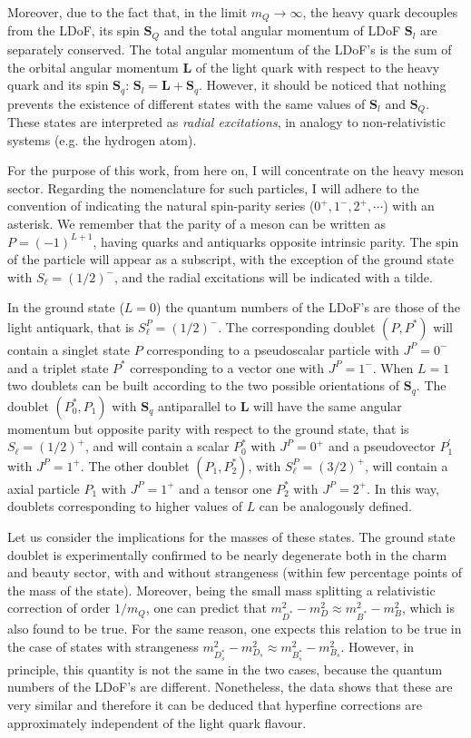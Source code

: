 Moreover, due to the fact that, in the limit $m_Q \to \infty$, the heavy quark decouples from the LDoF, its spin $\symbf{S}_Q$ and the total angular momentum of LDoF $\symbf{S}_l$ are separately conserved. The total angular momentum of the LDoF's is the sum of the orbital angular momentum $\symbf{L}$ of the light quark with respect to the heavy quark and its spin $\symbf{S}_q$: $\symbf{S}_l = \symbf{L} + \symbf{S}_q$. However, it should be noticed that nothing prevents the existence of different states with the same values of $\symbf{S}_l$ and $\symbf{S}_Q$. These states are interpreted as \emph{radial excitations}, in analogy to non-relativistic systems (e.g. the hydrogen atom).

For the purpose of this work, from here on, I will concentrate on the heavy meson sector. Regarding the nomenclature for such particles, I will adhere to the convention of indicating the natural spin-parity series ($0^+, 1^-, 2^+, \cdots$) with an asterisk. We remember that the parity of a meson can be written as $P = (-1)^{L+1}$, having quarks and antiquarks opposite intrinsic parity. The spin of the particle will appear as a subscript, with the exception of the ground state with $S_\ell = (1/2)^-$, and the radial excitations will be indicated with a tilde.

In the ground state ($L = 0$) the quantum numbers of the LDoF's are those of the light antiquark, that is $S_\ell^P = (1/2)^-$. The corresponding doublet $(P, P^*)$ will contain a singlet state $P$ corresponding to a pseudoscalar particle with $J^P = 0^-$ and a triplet state $P^*$ corresponding to a vector one with $J^P = 1^-$. When $L =1$ two doublets can be built according to the two possible orientations of $\symbf{S}_q$. The doublet $(P_0^*, P_1)$ with $\symbf{S}_q$ antiparallel to $\symbf{L}$ will have the same angular momentum but opposite parity with respect to the ground state, that is $S_\ell = (1/2)^+$, and will contain a scalar $P_0^*$ with $J^P = 0^+$ and a pseudovector $P^\prime_1$ with $J^P = 1^+$. The other doublet $(P_1 , P_2^*)$, with $S_\ell^P = (3/2)^+$, will contain a axial particle $P_1$ with $J^P = 1^+$ and a tensor one $P_2^*$ with $J^P = 2^+$. In this way, doublets corresponding to higher values of $L$ can be analogously defined.

Let us consider the implications for the masses of these states. The ground state doublet is experimentally confirmed to be nearly degenerate both in the charm and beauty sector, with and without strangeness (within few percentage points of the mass of the state). Moreover, being the small mass splitting a relativistic correction of order $1/m_Q$, one can predict that $m^2_{D^*} - m^2_D \approx m^2_{B^*} - m^2_B$, which is also found to be true. For the same reason, one expects this relation to be true in the case of states with strangeness $m^2_{D_s^*} - m^2_{D_s} \approx m^2_{B_s^*} - m^2_{B_s}$. However, in principle, this quantity is not the same in the two cases, because the quantum numbers of the LDoF's are different. Nonetheless, the data shows that these are very similar and therefore it can be deduced that hyperfine corrections are approximately independent of the light quark flavour.

